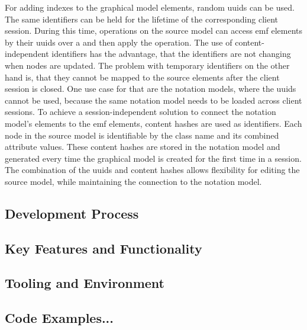   For adding indexes to the graphical model elements, random \acp{uuid} can be used. The same identifiers can be held for the lifetime of the corresponding client session. During this time, operations on the source model can access \ac{emf} elements by their \acp{uuid} over a  and then apply the operation. The use of content-independent identifiers has the advantage, that the identifiers are not changing when nodes are updated. The problem with temporary identifiers on the other hand is, that they cannot be mapped to the source elements after the client session is closed. One use case for that are the notation models, where the \acp{uuid} cannot be used, because the same notation model needs to be loaded across client sessions. To achieve a session-independent solution to connect the notation model's elements to the \ac{emf} elements, content hashes are used as identifiers. Each node in the source model is identifiable by the class name and its combined attribute values. These content hashes are stored in the notation model and generated every time the graphical model is created for the first time in a session. The combination of the \acp{uuid} and content hashes allows flexibility for editing the source model, while maintaining the connection to the notation model.

  \subsection{Development Process}
  \label{subsec:development-process}

  \subsection{Key Features and Functionality}
  \label{subsec:key-features}

  \subsection{Tooling and Environment}
  \label{subsec:tooling}

  \subsection{Code Examples...}
  \label{subsec:code-examples}